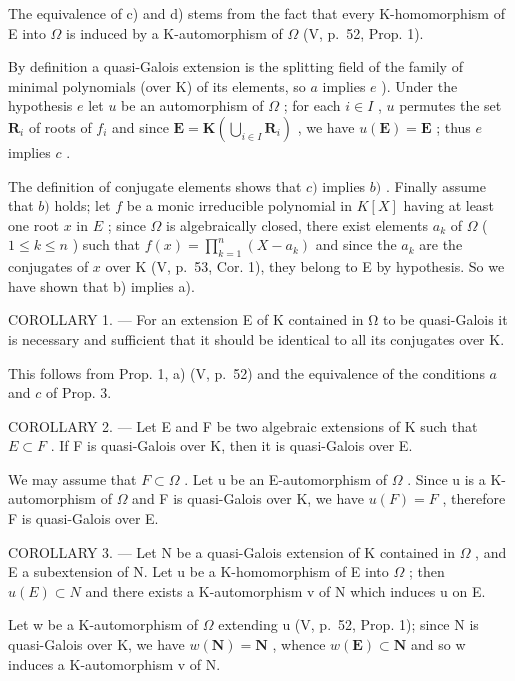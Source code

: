 The equivalence of c) and d) stems from the fact that every K-homomorphism of E into \(\Omega\) is induced by a K-automorphism of \(\Omega\) (V, p.~52, Prop. 1).

By definition a quasi-Galois extension is the splitting field of the family of minimal polynomials (over K) of its elements, so \(a\) implies \(e\) ). Under the hypothesis \(e\) let \(u\) be an automorphism of \(\Omega\) ; for each \(i \in I\) , \(u\) permutes the set \(\mathbf{R}_i\) of roots of \(f_i\) and since \(\mathbf{E} = \mathbf{K}\left(\bigcup_{i \in I} \mathbf{R}_i\right)\) , we have \(u(\mathbf{E}) = \mathbf{E}\) ; thus \(e\) implies \(c\) .

The definition of conjugate elements shows that \(c)\) implies \(b)\) . Finally assume that \(b)\) holds; let \(f\) be a monic irreducible polynomial in \(K[X]\) having at least one root \(x\) in \(E\) ; since \(\Omega\) is algebraically closed, there exist elements \(a_k\) of \(\Omega\) ( \(1 \leqslant k \leqslant n\) ) such that \(f(x) = \prod_{k=1}^{n} (X - a_k)\) and since the \(a_k\) are the conjugates of \(x\) over K (V, p.~53, Cor. 1), they belong to E by hypothesis. So we have shown that b) implies a).

COROLLARY 1. --- For an extension E of K contained in Ω to be quasi-Galois it is necessary and sufficient that it should be identical to all its conjugates over K.

This follows from Prop. 1, a) (V, p.~52) and the equivalence of the conditions \(a\) and \(c\) of Prop. 3.

COROLLARY 2. --- Let E and F be two algebraic extensions of K such that \(E \subset F\) . If F is quasi-Galois over K, then it is quasi-Galois over E.

We may assume that \(F \subset \Omega\) . Let u be an E-automorphism of \(\Omega\) . Since u is a K-automorphism of \(\Omega\) and F is quasi-Galois over K, we have \(u(F) = F\) , therefore F is quasi-Galois over E.

COROLLARY 3. --- Let N be a quasi-Galois extension of K contained in \(\Omega\) , and E a subextension of N. Let u be a K-homomorphism of E into \(\Omega\) ; then \(u(E) \subset N\) and there exists a K-automorphism v of N which induces u on E.

Let w be a K-automorphism of \(\Omega\) extending u (V, p.~52, Prop. 1); since N is quasi-Galois over K, we have \(w(\mathbf{N}) = \mathbf{N}\) , whence \(w(\mathbf{E}) \subset \mathbf{N}\) and so w induces a K-automorphism v of N.

